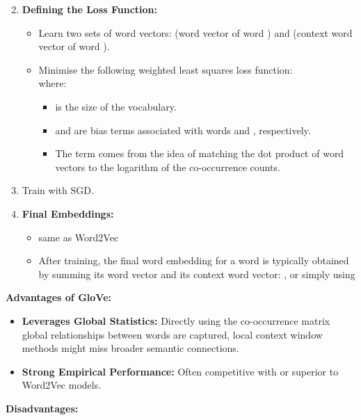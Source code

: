 \documentclass[
]{article}
\providecommand{\tightlist}{%
  \setlength{\itemsep}{0pt}\setlength{\parskip}{0pt}}
\begin{document}
\begin{enumerate}
\setcounter{enumi}{1}
\item
  \textbf{Defining the Loss Function:}

  \begin{itemize}
  \tightlist
  \item
    Learn two sets of word vectors: {} (word vector of word {}) and {}
    (context word vector of word {}).
  \item
    Minimise the following weighted least squares loss function:\\
    {} where:

    \begin{itemize}
    \tightlist
    \item
      {} is the size of the vocabulary.
    \item
      {} and {} are bias terms associated with words {} and {},
      respectively.
    \item
      The term {} comes from the idea of matching the dot product of
      word vectors to the logarithm of the co-occurrence counts.
    \end{itemize}
  \end{itemize}
\item
  Train with SGD.
\item
  \textbf{Final Embeddings:}

  \begin{itemize}
  \tightlist
  \item
    same as Word2Vec
  \item
    After training, the final word embedding for a word {} is typically
    obtained by summing its word vector and its context word vector: {},
    or simply using {}
  \end{itemize}
\end{enumerate}

\textbf{Advantages of GloVe:}

\begin{itemize}
\tightlist
\item
  \textbf{Leverages Global Statistics:} Directly using the co-occurrence
  matrix global relationships between words are captured, local context
  window methods might miss broader semantic connections.
\item
  \textbf{Strong Empirical Performance:} Often competitive with or
  superior to Word2Vec models.
\end{itemize}

\textbf{Disadvantages:}
\end{document}

